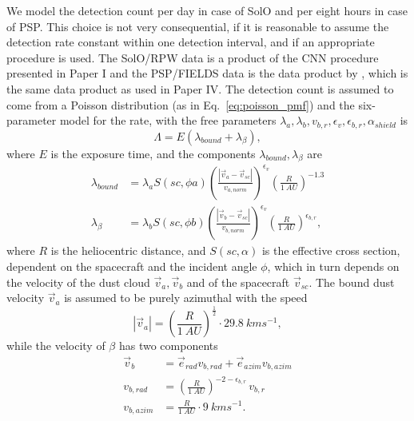 We model the detection count per day in case of SolO and per eight hours in case of PSP. This choice is not very consequential, if it is reasonable to assume the detection rate constant within one detection interval, and if an appropriate procedure is used. The SolO/RPW data is a product of the CNN procedure presented in Paper I and the PSP/FIELDS data is the data product by \citet{malaspina2023dust}, which is the same data product as used in Paper IV. The detection count is assumed to come from a Poisson distribution (as in Eq.~\ref{eq:poisson_pmf}) and the six-parameter model for the rate, with the free parameters $\lambda_a, \lambda_b, v_{b,r}, \epsilon_v, \epsilon_{b,r}, \alpha_{shield}$ is 
\begin{equation}
    \Lambda = E (\lambda_{bound} + \lambda_{\beta}),
\end{equation}
where $E$ is the exposure time, and the components $\lambda_{bound},\lambda_{\beta}$ are
\begin{equation}\begin{split}
    \lambda_{bound} &= \lambda_a  S(sc,\phi{a}) \left( \frac{|\vec{v}_{a} - \vec{v}_{sc}|}{v_{a,norm}}\right)^{\epsilon_v} \left( \frac{R}{\SI{1}{AU}} \right)^{-1.3} \\
    \lambda_{\beta} &= \lambda_b S(sc,\phi{b}) \left( \frac{|\vec{v}_{b} - \vec{v}_{sc}|}{v_{b,norm}}\right)^{\epsilon_v} \left( \frac{R}{\SI{1}{AU}} \right)^{\epsilon_{b,r}},
\end{split}\end{equation}
where $R$ is the heliocentric distance, and $S(sc,\alpha)$ is the effective cross section, dependent on the spacecraft and the incident angle $\phi$, which in turn depends on the velocity of the dust cloud $\vec{v}_a,\vec{v}_b$ and of the spacecraft $\vec{v}_{sc}$. The bound dust velocity $\vec{v}_a$ is assumed to be purely azimuthal with the speed
\begin{equation}
    |\vec{v}_a| = \left( \frac{R}{\SI{1}{AU}} \right)^\frac{1}{2} \cdot \SI{29.8}{kms^{-1}},
\end{equation}
while the velocity of $\beta$ has two components
\begin{equation}\begin{split}
    \vec{v}_b &= \vec{e}_{rad} v_{b,rad} + \vec{e}_{azim} v_{b,azim} \\
    v_{b,rad} &= \left( \frac{R}{\SI{1}{AU}} \right)^{-2-\epsilon_{b,r}} \, v_{b,r} \\
    v_{b,azim} &= \frac{R}{\SI{1}{AU}} \cdot \SI{9}{kms^{-1}}.
\end{split}\end{equation}
